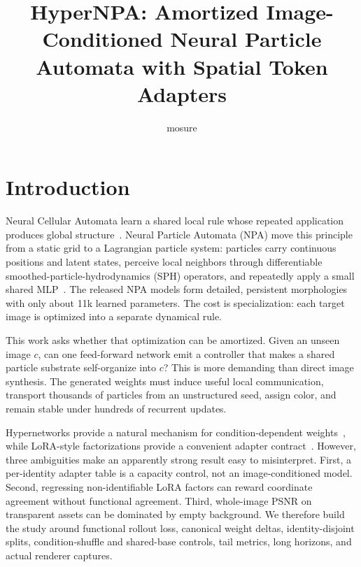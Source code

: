 \documentclass[sigconf,nonacm]{acmart}
\title{HyperNPA: Amortized Image-Conditioned Neural Particle Automata with Spatial Token Adapters}
\author{mosure}
\affiliation{%
  \institution{Independent Research}
  \city{Remote}
  \country{USA}
}
\begin{document}
\maketitle

\section{Introduction}

Neural Cellular Automata learn a shared local rule whose repeated application
produces global structure~\cite{mordvintsev2020growing}. Neural Particle
Automata (NPA) move this principle from a static grid to a Lagrangian particle
system: particles carry continuous positions and latent states, perceive local
neighbors through differentiable smoothed-particle-hydrodynamics (SPH)
operators, and repeatedly apply a small shared MLP~\cite{kim2026npa}. The
released NPA models form detailed, persistent morphologies with only about
11k learned parameters. The cost is specialization: each target image is
optimized into a separate dynamical rule.

This work asks whether that optimization can be amortized. Given an unseen
image $c$, can one feed-forward network emit a controller that makes a shared
particle substrate self-organize into $c$? This is more demanding than direct
image synthesis. The generated weights must induce useful local communication,
transport thousands of particles from an unstructured seed, assign color, and
remain stable under hundreds of recurrent updates.

Hypernetworks provide a natural mechanism for condition-dependent
weights~\cite{ha2016hypernetworks}, while LoRA-style factorizations provide a
convenient adapter contract~\cite{hu2021lora}. However, three ambiguities make
an apparently strong result easy to misinterpret. First, a per-identity
adapter table is a capacity control, not an image-conditioned model. Second,
regressing non-identifiable LoRA factors can reward coordinate agreement
without functional agreement. Third, whole-image PSNR on transparent assets
can be dominated by empty background. We therefore build the study around
functional rollout loss, canonical weight deltas, identity-disjoint splits,
condition-shuffle and shared-base controls, tail metrics, long horizons, and
actual renderer captures.
\end{document}
